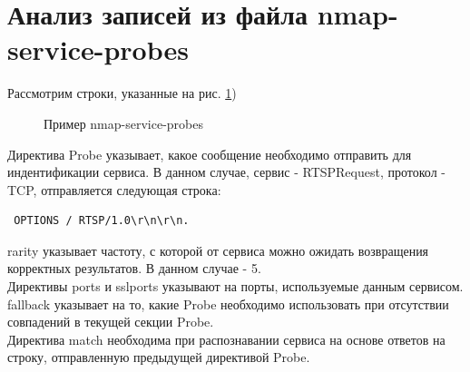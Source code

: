 \documentclass[10pt,a4paper]{report}
\begin{document}
\section{Анализ записей из файла nmap-service-probes}	
Рассмотрим строки, указанные на рис. \ref{pic:pic11})	

\begin{figure}[ht]	
	\caption{Пример nmap-service-probes}
	\label{pic:pic11}
\end{figure} 
Директива Probe указывает, какое сообщение необходимо отправить для индентификации сервиса. В данном случае, сервис - RTSPRequest, протокол - TCP, отправляется следующая строка:
\begin{verbatim}
 OPTIONS / RTSP/1.0\r\n\r\n. 
\end{verbatim}
rarity указывает частоту, с которой от сервиса можно ожидать возвращения корректных результатов. В данном случае - 5. \\
Директивы ports и sslports указывают на порты, используемые данным сервисом. \\
fallback указывает на то, какие Probe необходимо использовать при отсутствии совпадений в текущей секции Probe. \\
Директива match необходима при распознавании сервиса на основе ответов на строку, отправленную предыдущей директивой Probe.
\end{document}
